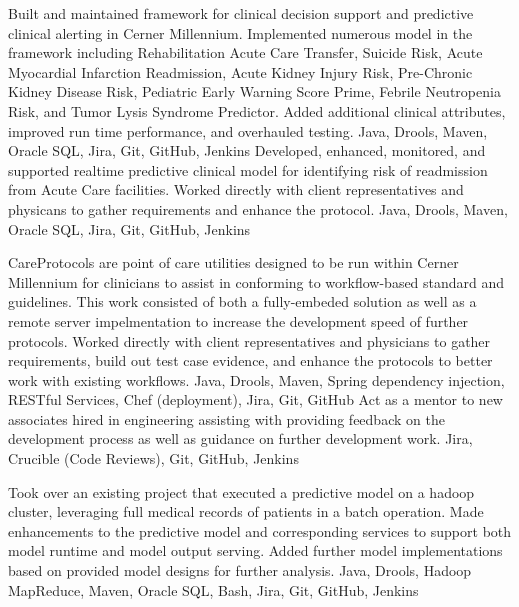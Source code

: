 \resumeCompanyStart
\resumeCompanyEnd

\resumeItemListStart
    {Built and maintained framework for clinical decision support and predictive clinical alerting in Cerner Millennium. Implemented numerous model in the framework including Rehabilitation Acute Care Transfer, Suicide Risk, Acute Myocardial Infarction Readmission, Acute Kidney Injury Risk, Pre-Chronic Kidney Disease Risk, Pediatric Early Warning Score Prime, Febrile Neutropenia Risk, and Tumor Lysis Syndrome Predictor. Added additional clinical attributes, improved run time performance, and overhauled testing.}
    {Java, Drools, Maven, Oracle SQL, Jira, Git, GitHub, Jenkins}
    {Developed, enhanced, monitored, and supported realtime predictive clinical model for identifying risk of readmission from Acute Care facilities.  Worked directly with client representatives and physicans to gather requirements and enhance the protocol.}
    {Java, Drools, Maven, Oracle SQL, Jira, Git, GitHub, Jenkins}
\resumeItemListEnd

\resumeCompanyStart
\resumeCompanyEnd
\resumeItemListStart
    {CareProtocols are point of care utilities designed to be run within Cerner Millennium for clinicians to assist in conforming to workflow-based standard and guidelines. This work consisted of both a fully-embeded solution as well as a remote server impelmentation to increase the development speed of further protocols. Worked directly with client representatives and physicians to gather requirements, build out test case evidence, and enhance the protocols to better work with existing workflows. }
    {Java, Drools, Maven, Spring dependency injection, RESTful Services, Chef (deployment), Jira, Git, GitHub}
    {Act as a mentor to new associates hired in engineering assisting with providing feedback on the development process as well as guidance on further development work.}
    {Jira, Crucible (Code Reviews), Git, GitHub, Jenkins}
\resumeItemListEnd

\resumeCompanyStart
\resumeCompanyEnd
\resumeItemListStart
    {Took over an existing project that executed a predictive model on a hadoop cluster, leveraging full medical records of patients in a batch operation. Made enhancements to the predictive model and corresponding services to support both model runtime and model output serving. Added further model implementations based on provided model designs for further analysis.}
    {Java, Drools, Hadoop MapReduce, Maven, Oracle SQL, Bash, Jira, Git, GitHub, Jenkins}
\resumeItemListEnd